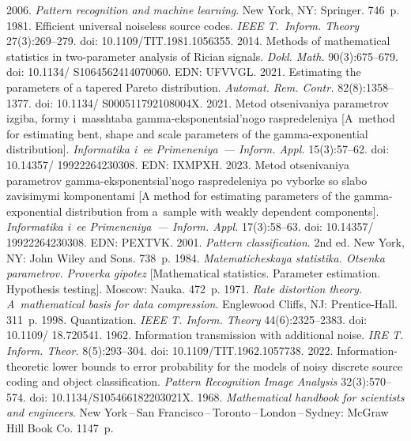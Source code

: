 \begin{multicols}{2}
{{\begin{thebibliography}{99}
 2006. \textit{Pattern recognition and machine learning}. New York, NY: Springer. 
746~p. %
 1981. Efficient universal 
noiseless source codes. \textit{IEEE T.~Inform. Theory} 27(3):269--279.  doi: 10.1109/TIT.1981.1056355.
 2014. Methods of mathematical statistics in two-parameter 
analysis of Rician signals. \textit{Dokl. Math.} 90(3):675--679. doi: 10.1134/ S1064562414070060. EDN: 
UFVVGL.
 2021. Estimating the parameters of a tapered 
Pareto distribution. \textit{Automat. Rem. Contr.} 82(8):1358--1377. doi: 10.1134/ S000511792108004X.
 2021. Metod otsenivaniya parametrov 
izgiba, formy i~masshtaba gamma-eksponentsial'nogo raspredeleniya [A~method for estimating bent, shape and 
scale parameters of the gamma-exponential distribution]. \textit{Informatika i~ee Primeneniya~--- Inform. 
Appl.} 15(3):57--62. doi: 10.14357/ 19922264230308. EDN: IXMPXH.
 2023. Metod otsenivaniya parametrov gamma-eksponentsial'nogo 
raspredeleniya po vyborke so slabo zavisimymi komponentami [A method for estimating 
parameters of the gamma-exponential distribution from a~sample with weakly dependent components]. 
\textit{Informatika i~ee Primeneniya~--- Inform. Appl.}  17(3):58--63. doi: 10.14357/ 19922264230308. EDN: 
PEXTVK.
 2001. \textit{Pattern classification}. 2nd ed. New York, NY: John 
Wiley and Sons. 738~p.
 1984. \textit{Matematicheskaya statistika. Otsenka parametrov. Proverka gipotez} 
[Mathematical statistics. Parameter estimation. Hypothesis testing].  Moscow: Nauka. 472~p.
 1971. \textit{Rate distortion theory. A~mathematical basis for data compression}. Englewood Cliffs, 
NJ: Prentice-Hall. 311~p.
 1998. Quantization. \textit{IEEE T. Inform. Theory} 44(6):2325--2383. 
doi: 10.1109/ 18.720541.
 1962. Information transmission with additional noise. \textit{IRE 
T. Inform. Theor.} 8(5):293--304. doi: 10.1109/TIT.1962.1057738.
 2022. Information-theoretic lower bounds to error probability for the 
models of noisy discrete source coding and object classification. \textit{Pattern Recognition Image Analysis} 
32(3):570--574. doi: 10.1134/S105466182203021X.
 1968. \textit{Mathematical handbook for scientists and engineers}.  
New York\,--\,San Francisco\,--\,Toronto\,--\,London\,--\,Sydney: McGraw Hill Book Co. 1147~p. 

\end{thebibliography}

 }
 }

\end{multicols}

